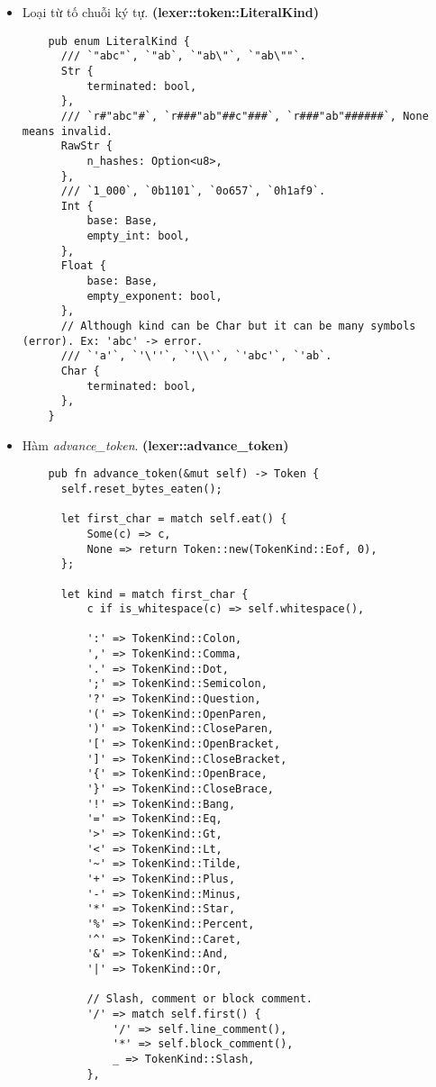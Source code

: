 {\begin{itemize}
\begin{lstlisting}[]
      /// End of input.
      Eof,
    }
  \end{lstlisting}
  \item Loại từ tố chuỗi ký tự. \textbf{(lexer::token::LiteralKind)}
  \begin{lstlisting}
    pub enum LiteralKind {
      /// `"abc"`, `"ab`, `"ab\"`, `"ab\""`.
      Str {
          terminated: bool,
      },
      /// `r#"abc"#`, `r###"ab"##c"###`, `r###"ab"######`, None means invalid.
      RawStr {
          n_hashes: Option<u8>,
      },
      /// `1_000`, `0b1101`, `0o657`, `0h1af9`.
      Int {
          base: Base,
          empty_int: bool,
      },
      Float {
          base: Base,
          empty_exponent: bool,
      },
      // Although kind can be Char but it can be many symbols (error). Ex: 'abc' -> error.
      /// `'a'`, `'\''`, `'\\'`, `'abc'`, `'ab`.
      Char {
          terminated: bool,
      },
    }
  \end{lstlisting}
  \item Hàm \textit{advance\_token}. \textbf{(lexer::advance\_token)}
  \begin{lstlisting}
    pub fn advance_token(&mut self) -> Token {
      self.reset_bytes_eaten();

      let first_char = match self.eat() {
          Some(c) => c,
          None => return Token::new(TokenKind::Eof, 0),
      };

      let kind = match first_char {
          c if is_whitespace(c) => self.whitespace(),

          ':' => TokenKind::Colon,
          ',' => TokenKind::Comma,
          '.' => TokenKind::Dot,
          ';' => TokenKind::Semicolon,
          '?' => TokenKind::Question,
          '(' => TokenKind::OpenParen,
          ')' => TokenKind::CloseParen,
          '[' => TokenKind::OpenBracket,
          ']' => TokenKind::CloseBracket,
          '{' => TokenKind::OpenBrace,
          '}' => TokenKind::CloseBrace,
          '!' => TokenKind::Bang,
          '=' => TokenKind::Eq,
          '>' => TokenKind::Gt,
          '<' => TokenKind::Lt,
          '~' => TokenKind::Tilde,
          '+' => TokenKind::Plus,
          '-' => TokenKind::Minus,
          '*' => TokenKind::Star,
          '%' => TokenKind::Percent,
          '^' => TokenKind::Caret,
          '&' => TokenKind::And,
          '|' => TokenKind::Or,

          // Slash, comment or block comment.
          '/' => match self.first() {
              '/' => self.line_comment(),
              '*' => self.block_comment(),
              _ => TokenKind::Slash,
          },


\end{lstlisting}
\end{itemize}}
